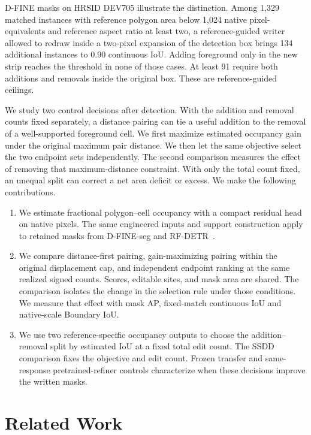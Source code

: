 \documentclass[journal]{IEEEtran}
\begin{document}
D-FINE masks on HRSID DEV705 illustrate the distinction. Among 1,329 matched instances with reference polygon area below 1,024 native pixel-equivalents and reference aspect ratio at least two, a reference-guided writer allowed to redraw inside a two-pixel expansion of the detection box brings 134 additional instances to 0.90 continuous IoU. Adding foreground only in the new strip reaches the threshold in none of those cases. At least 91 require both additions and removals inside the original box. These are reference-guided ceilings.

We study two control decisions after detection. With the addition and removal counts fixed separately, a distance pairing can tie a useful addition to the removal of a well-supported foreground cell. We first maximize estimated occupancy gain under the original maximum pair distance. We then let the same objective select the two endpoint sets independently. The second comparison measures the effect of removing that maximum-distance constraint. With only the total count fixed, an unequal split can correct a net area deficit or excess. We make the following contributions.
\begin{enumerate}
\item We estimate fractional polygon--cell occupancy with a compact residual head on native pixels. The same engineered inputs and support construction apply to retained masks from D-FINE-seg and RF-DETR~\cite{dfine,rfdetr}.
\item We compare distance-first pairing, gain-maximizing pairing within the original displacement cap, and independent endpoint ranking at the same realized signed counts. Scores, editable sites, and mask area are shared. The comparison isolates the change in the selection rule under those conditions. We measure that effect with mask AP, fixed-match continuous IoU and native-scale Boundary IoU.
\item We use two reference-specific occupancy outputs to choose the addition--removal split by estimated IoU at a fixed total edit count. The SSDD comparison fixes the objective and edit count. Frozen transfer and same-response pretrained-refiner controls characterize when these decisions improve the written masks.
\end{enumerate}

\section{Related Work}
\label{sec:related-work}
\end{document}
